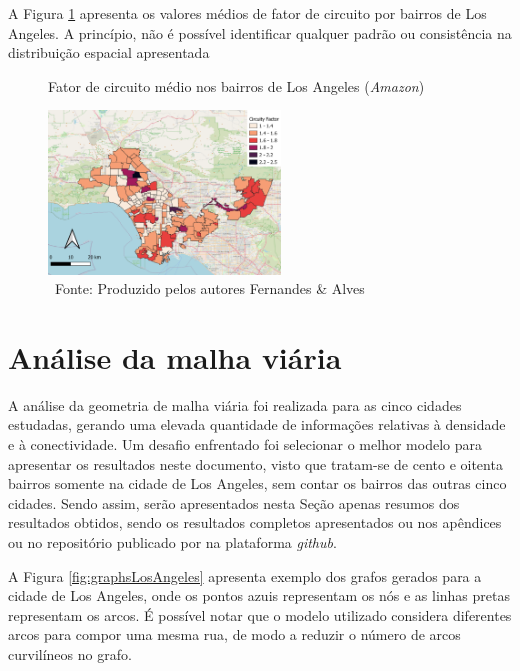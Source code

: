 A Figura \ref{fig:fc_medio_LA} apresenta os valores médios de fator de circuito por bairros de Los Angeles.
A princípio, não é possível identificar qualquer padrão ou consistência na distribuição espacial apresentada

\begin{figure}[H]
    \centering
    \caption{Fator de circuito médio nos bairros de Los Angeles (\textit{Amazon})}
    \label{fig:fc_medio_LA}
    \includegraphics[width=0.55\textwidth]{images/6_amazon/fc/fc_la_avvg_per_stop.png}
    \caption*{\ Fonte: Produzido pelos autores Fernandes \& Alves}
\end{figure}

\section{Análise da malha viária} \label{sec:Amazon_MalhaViaria}

A análise da geometria de malha viária foi realizada para as cinco cidades estudadas, gerando uma elevada quantidade de informações relativas à densidade e à conectividade.
Um desafio enfrentado foi selecionar o melhor modelo para apresentar os resultados neste documento, visto que tratam-se de cento e oitenta bairros somente na cidade de Los Angeles, sem contar os bairros das outras cinco cidades.
Sendo assim, serão apresentados nesta Seção apenas resumos dos resultados obtidos, sendo os resultados completos apresentados ou nos apêndices ou no repositório publicado por  na plataforma \textit{github}.

A Figura \ref{fig:graphsLosAngeles} apresenta exemplo dos grafos gerados para a cidade de Los Angeles, onde os pontos azuis representam os nós e as linhas pretas representam os arcos.
É possível notar que o modelo utilizado considera diferentes arcos para compor uma mesma rua, de modo a reduzir o número de arcos curvilíneos no grafo.

